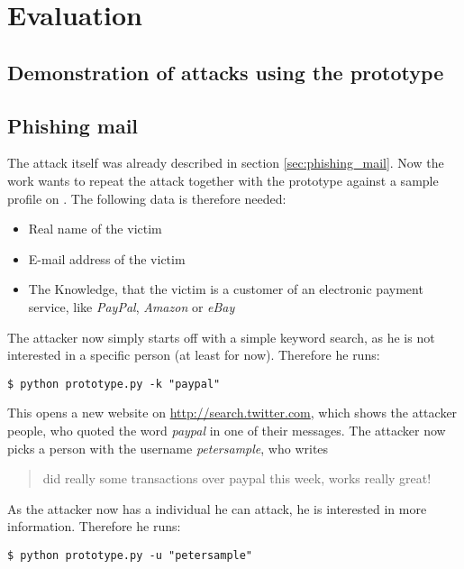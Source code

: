 \chapter{Evaluation}
\label{chapter:evaluation}

\section{Demonstration of attacks using the prototype}

\section{Phishing mail}

The attack itself was already described in section \ref{sec:phishing_mail}. Now
the work wants to repeat the attack together with the prototype against a
sample profile on \Twitter{}. The following data is therefore needed:

\begin{itemize}
  \item Real name of the victim
  \item E-mail address of the victim
  \item The Knowledge, that the victim is a customer of an electronic
  payment service, like \textit{PayPal}, \textit{Amazon} or \textit{eBay}
\end{itemize}

The attacker now simply starts off with a simple keyword search, as he is not
interested in a specific person (at least for now). Therefore he runs:

\lstset{language=bash}
\begin{lstlisting}
$ python prototype.py -k "paypal"
\end{lstlisting}

This opens a new website on \url{http://search.twitter.com}, which shows the
attacker people, who quoted the word \textit{paypal} in one of their messages.
The attacker now picks a person with the username \textit{petersample}, who writes

\begin{quote}
did really some transactions over paypal this week, works really great!
\end{quote}

As the attacker now has a individual he can attack, he is interested in more
information. Therefore he runs:

\lstset{language=bash}
\begin{lstlisting}
$ python prototype.py -u "petersample"
\end{lstlisting}


